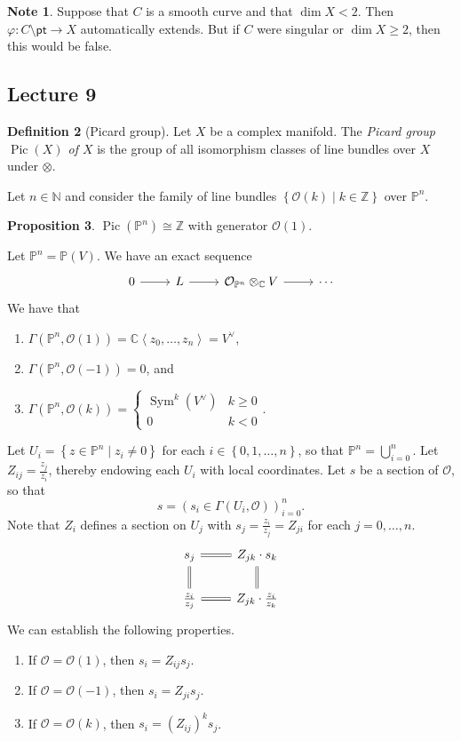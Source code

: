 \documentclass[10pt,letterpaper,cm]{nupset}
\theoremstyle{definition}
\newtheorem{defn}{Definition}[subsection]
\newtheorem{note}[defn]{Note}
\theoremstyle{theorem}
\newtheorem{prop}[defn]{Proposition}
\theoremstyle{remark}
\newcommand{\C}{\mathbb C}
\newcommand{\N}{\mathbb N}
\renewcommand{\O}{\mathcal O}
\renewcommand{\P}{\mathbb P}
\newcommand{\Z}{\mathbb Z}
\newcommand{\1}{\mathbb{1}}
\newcommand{\0}{\vec 0}
\newcommand{\pt}{\mathsf{pt}}
\DeclareMathOperator{\pic}{Pic}
\DeclareMathOperator{\sym}{Sym}
\newcommand{\be}{\begin{enumerate}}
\newcommand{\ee}{\end{enumerate}}
\begin{document}
\begin{note}
Suppose that $C$ is a smooth curve and that $\dim{X} < 2$. Then $\varphi : C \setminus \pt \to X$ automatically extends.  But if $C$ were singular or $\dim{X} \geq 2$, then this would be false.
\end{note}

\subsection{Lecture 9}

\begin{defn}[Picard group]
Let $X$ be a complex manifold. The \textit{Picard group $\pic(X)$ of $X$} is the group of all isomorphism classes of line bundles over $X$ under $\otimes$.
\end{defn}

Let $n\in \N$ and consider the family of line bundles $\left\{\O(k) \mid k \in \Z\right\}$ over $\P^n$.

\begin{prop}
$\pic\left(\P^n\right) \cong \Z$ with generator $\O(1)$. 
\end{prop}

Let $\P^n = \P(V)$. We have an exact sequence
\[
\begin{tikzcd}
0 \arrow[r] & L \arrow[r] & \O_{\P^n}\otimes_{\C} V \arrow[r] & \cdots
\end{tikzcd}
\]
We have that
\be
\item $\Gamma\left(\P^n , \O(1)\right) = \C\left\langle z_0, \ldots, z_n\right\rangle = V^{\vee}$,
\item $\Gamma \left(\P^n, \O({-1})\right) =0$, and
\item $\Gamma \left(\P^n, \O(k)\right) = \begin{cases} \sym^k\left(V^{\vee}\right) & k\geq0 \\ 0 & k<0\end{cases}$.
\ee

Let $U_i = \left\{z \in \P^n \mid z_i \ne 0\right\}$ for each $i\in \left\{0, 1, \ldots, n\right\}$, so that $\P^n = \bigcup_{i=0}^n$. Let $Z_{ij} = \frac{z_j}{z_i}$, thereby endowing each $U_i$ with local coordinates. Let $s$ be a section of $\O$, so that $$s = \left(s_i \in \Gamma\left(U_i, \O\right)\right)_{i=0}^n.$$ Note that $Z_i$ defines a section on $U_j$ with $s_j = \frac{z_i}{z_j} = Z_{ji}$ for each $j=0, \ldots, n$. 
\[
\begin{tikzcd}
s_j \arrow[r, equals] \arrow[d, equals]   & Z_{jk}\cdot s_k \arrow[d, equals]  \\
\frac{z_i}{z_j} \arrow[r, equals] & Z_{jk}\cdot\frac{z_i}{z_k}
\end{tikzcd}
\]
We can establish the following properties.
\be
\item If $\O= \O(1)$, then $s_i = Z_{ij}s_j$.
\item If $\O = \O({-1})$, then $s_i = Z_{ji}s_j$.
\item If $\O = \O(k)$, then $s_i = \left(Z_{ij}\right)^ks_j$.
\ee
\end{document}
